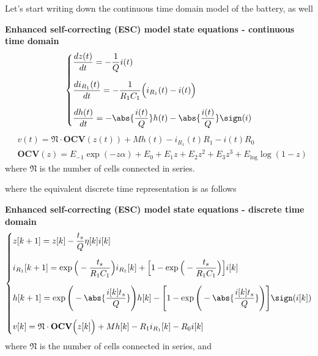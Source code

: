\documentclass[12pt,a4paper,oneside]{book}
\begin{document}
\begin{onehalfspace}
Let's start writing down the continuous time domain model of the battery, as well
\begin{mybox}
	\textbf{Enhanced self-correcting (ESC) model state equations - continuous 
		time domain}
	\begin{equation}\label{lithium_ion_battery_ctrl_problem_eq_2}
		\left\lbrace \begin{aligned}
			&	\frac{dz(t)}{dt} = -\frac{1}{Q}i(t) \\[6pt]
			&	\frac{di_{R_1}(t)}{dt} = -\frac{1}{R_1C_1}\Big(i_{R_1}(t)-i(t)\Big) \\[6pt]
			&\frac{dh(t)}{dt} = 
			-\abs{\frac{i(t)}{Q}}h(t)-\abs{\frac{i(t)}{Q}}\sign(i) 
		\end{aligned}\right. 
	\end{equation}
	\begin{equation}\label{lithium_ion_battery_ctrl_problem_eq_1}
		\begin{aligned}
			&	v(t) = \mathfrak{N}\cdot\mathbf{OCV}(z(t)) + Mh(t) - i_{R_1}(t)R_1 
			- i(t)R_0 \\[6pt]
			& \mathbf{OCV}(z) = E_{-1}\exp(-z\alpha) + E_0 + E_1z + E_2z^2 + E_3z^3 
			+  E_\text{log}\log({1-z})
		\end{aligned}
	\end{equation}
	where $\mathfrak{N}$ is the number of cells connected in series.
\end{mybox}
where the equivalent discrete time representation is as follows
\begin{mybox}
	\textbf{Enhanced self-correcting (ESC) model state equations - discrete time 
		domain}
	\begin{equation}\label{lithium_ion_battery_ctrl_problem_eq_3}
		\left\lbrace \begin{aligned}
			&	z[k+1] =z[k] -\frac{t_s}{Q}\eta[k]i[k] \\[6pt]
			&	i_{R_1}[k+1] = \exp\Big(-\frac{t_s}{R_1C_1}\Big)i_{R_1}[k]+\Big[1-\exp\Big(-\frac{t_s}{R_1C_1}\Big)\Big]i[k] \\[6pt]
			&	h[k+1] = \exp\Bigg(-\abs{\frac{i[k] t_s}{Q}}\Bigg)h[k] - \Bigg[1-\exp\Bigg(-\abs{\frac{i[k] t_s}{Q}}\Bigg)\Bigg]\sign(i[k]) \\[6pt]
			&	v[k] = \mathfrak{N}\cdot\mathbf{OCV}\Big(z[k]\Big) +Mh[k]-R_1i_{R_1}[k] - R_0i[k]
		\end{aligned}\right. 
	\end{equation}
	where $\mathfrak{N}$ is the number of cells connected in series, and
	\begin{equation}\label{lithium_ion_battery_ctrl_problem_eq_4}

\end{equation}
\end{mybox}
\end{onehalfspace}
\end{document}
